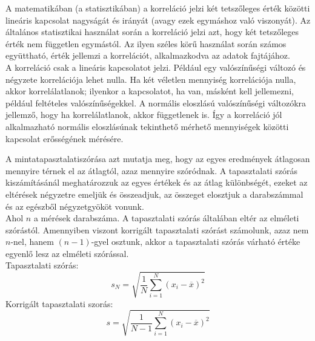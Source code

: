 \documentclass[11pt,a4paper]{article}
\begin{document}
\begin{tcolorbox}[colback=MidnightBlue!5!white,colframe=MidnightBlue!60!black,title= Korreláció]
    A matematikában (a statisztikában) a korreláció jelzi két tetszőleges érték közötti lineáris kapcsolat nagyságát és irányát (avagy ezek egymáshoz való viszonyát). Az általános statisztikai használat során a korreláció jelzi azt, hogy két tetszőleges érték nem független egymástól. Az ilyen széles körű használat során számos együttható, érték jellemzi a korrelációt, alkalmazkodva az adatok fajtájához.\\
    A korreláció csak a lineáris kapcsolatot jelzi. Például egy valószínűségi változó és négyzete korrelációja lehet nulla. Ha két véletlen mennyiség korrelációja nulla, akkor korrelálatlanok; ilyenkor a kapcsolatot, ha van, másként kell jellemezni, például feltételes valószínűségekkel. A normális eloszlású valószínűségi változókra jellemző, hogy ha korrelálatlanok, akkor függetlenek is. Így a korreláció jól alkalmazható normális eloszlásúnak tekinthető mérhető mennyiségek közötti kapcsolat erősségének mérésére.
\end{tcolorbox}

\begin{tcolorbox}[colback=MidnightBlue!5!white,colframe=MidnightBlue!60!black,title= Tapasztalati szórás és Korrigált tapasztalati szorás]
    A mintatapasztalatiszórása azt mutatja meg, hogy az egyes eredmények átlagosan mennyire térnek el az átlagtól, azaz mennyire szóródnak. A tapasztalati szórás kiszámításánál meghatározzuk az egyes értékek és az átlag különbségét, ezeket az eltérések négyzetre emeljük és összeadjuk, az összeget elosztjuk a darabszámmal és az egészből négyzetgyököt vonunk.\\
    Ahol $n$ a mérések darabszáma. A tapasztalati szórás általában eltér az elméleti szórástól. Amennyiben viszont korrigált tapasztalati szórást számolunk, azaz nem $n$-nel, hanem $(n-1)$-gyel osztunk, akkor a tapasztalati szórás várható értéke egyenlő lesz az elméleti szórással.\\

    Tapasztalati szórás:
    $$s_{N}={\sqrt {{\frac {1}{N}}\sum _{i=1}^{N}(x_{i}-{\overline {x}})^{2}}}$$
    Korrigált tapasztalati szorás:
    $$s={\sqrt {{\frac {1}{N-1}}\sum _{i=1}^{N}(x_{i}-{\overline {x}})^{2}}}$$
\end{tcolorbox}
\end{document}
